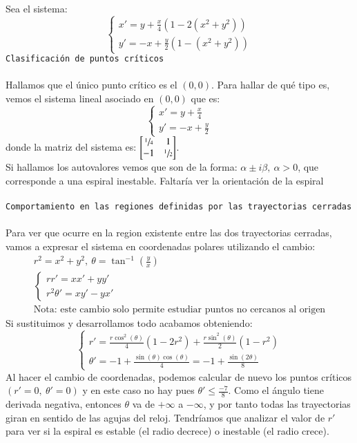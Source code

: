 \begin{eg}
    Sea el sistema:
    $$
        \begin{cases}
            x' = y + \frac{x}{4} (1 - 2(x^2+y^2))\\
            y' = -x + \frac{y}{2} (1 - (x^2+y^2))
        \end{cases}
    $$
    \texttt{Clasificación de puntos críticos}\\\\
    Hallamos que el único punto crítico es el $(0,0)$. Para hallar de qué tipo es, vemos el sistema lineal asociado en $(0,0)$ que es:
    $$
        \begin{cases}
            x' = y + \frac{x}{4}\\
            y' = -x + \frac{y}{2}
        \end{cases}
    $$
    donde la matriz del sistema es: $\mx{\sfrac{1}{4} & 1 \\ -1 & \sfrac{1}{2}}$.\\
    Si hallamos los autovalores vemos que son de la forma: $\alpha \pm i \beta,\ \alpha > 0$, que corresponde a una espiral inestable. Faltaría ver la orientación de la espiral\\\\
    \texttt{Comportamiento en las regiones definidas por las trayectorias cerradas}\\\\
    Para ver que ocurre en la region existente entre las dos trayectorias cerradas, vamos a expresar el sistema en coordenadas polares utilizando el cambio:
    \begin{gather*}
        r^2 = x^2 + y^2,\ \theta = \tan^{-1}\left(\frac{y}{x}\right)\\
        \begin{cases}
            rr' = xx' + yy'\\
            r^2\theta' = xy' - yx'
        \end{cases}\\
        \text{Nota: este cambio solo permite estudiar puntos no cercanos al origen}
    \end{gather*}
    Si sustituimos y desarrollamos todo acabamos obteniendo:
    $$
        \begin{cases}
            r' = \frac{r\cos^2(\theta)}{4} (1-2r^2)+ \frac{r\sin^2(\theta)}{2} (1-r^2)\\
            \theta' = -1 + \frac{\sin(\theta)\cos(\theta)}{4} = -1 + \frac{\sin(2\theta)}{8}
        \end{cases}
    $$
    Al hacer el cambio de coordenadas, podemos calcular de nuevo los puntos críticos $(r' = 0,\ \theta' = 0)$ y en este caso no hay pues $\theta' \leq \frac{-7}{8}$. Como el ángulo tiene derivada negativa, entonces $\theta$ va de $+ \infty$ a $-\infty$, y por tanto todas las trayectorias giran en sentido de las agujas del reloj. Tendríamos que analizar el valor de $r'$ para ver si la espiral es estable (el radio decrece) o inestable (el radio crece).
\end{eg}

